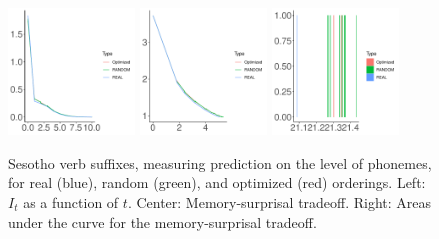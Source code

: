 \begin{figure}
	\begin{center}
\includegraphics[width=0.3\textwidth]{figures/Sesotho-suffixes-byPhonemes-it.pdf}
\includegraphics[width=0.3\textwidth]{figures/Sesotho-suffixes-byPhonemes-memsurp.pdf}
\includegraphics[width=0.3\textwidth]{figures/Sesotho-suffixes-byPhonemes-auc.pdf}
\end{center}
	\caption{Sesotho verb suffixes, measuring prediction on the level of phonemes, for real (blue), random (green), and optimized (red) orderings. Left: $I_t$ as a function of $t$. Center: Memory-surprisal tradeoff. Right: Areas under the curve for the memory-surprisal tradeoff.}\label{fig:jap-phon}
\end{figure}


